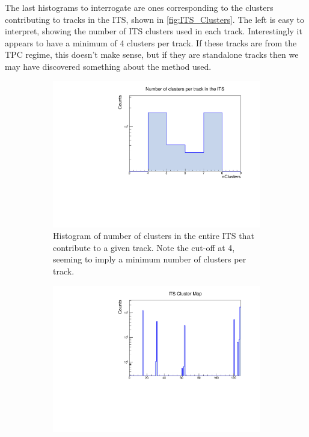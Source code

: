 \bigskip

The last histograms to interrogate are ones corresponding to the clusters contributing to tracks in the ITS, shown in \cref{fig:ITS_Clusters}. The left is easy to interpret, showing the number of ITS clusters used in each track. Interestingly it appears to have a minimum of 4 clusters per track. If these tracks are from the TPC regime, this doesn't make sense, but if they are standalone tracks then we may have discovered something about the method used.

\begin{figure}[h]%
    \centering
    \begin{subfigure}[t]{.49\linewidth}
        \centering
        \includegraphics[width=\linewidth]{Plots/pass4_TracksIU/itsNCls.pdf}
        \caption{Histogram of number of clusters in the entire ITS that contribute to a given track. Note the cut-off at 4, seeming to imply a minimum number of clusters per track.}
        \label{fig:ITS_NCls}
    \end{subfigure}
    \hfill
    \begin{subfigure}[t]{.49\linewidth}
        \centering
        \includegraphics[width=\linewidth]{Plots/pass4_TracksIU/itsClusterMap.pdf}

\end{subfigure}
\end{figure}
